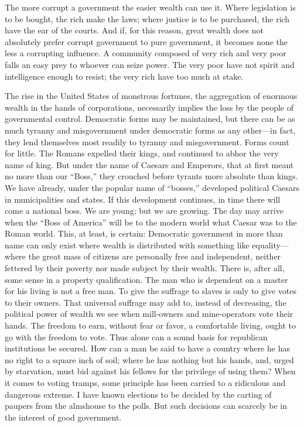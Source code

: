 \documentclass{book}
\begin{document}
The more corrupt a government the easier wealth can use it. Where legislation is to be bought, the rich make the laws; where justice is to be purchased, the rich have the ear of the courts. And if, for this reason, great wealth does not absolutely prefer corrupt government to pure government, it becomes none the less a corrupting influence. A community composed of very rich and very poor falls an easy prey to whoever can seize power. The very poor have not spirit and intelligence enough to resist; the very rich have too much at stake.

The rise in the United States of monstrous fortunes, the aggregation of enormous wealth in the hands of corporations, necessarily implies the loss by the people of governmental control. Democratic forms may be maintained, but there can be as much tyranny and misgovernment under democratic forms as any other—in fact, they lend themselves most readily to tyranny and misgovernment. Forms count for little. The Romans expelled their kings, and continued to abhor the very name of king. But under the name of Caesars and Emperors, that at first meant no more than our “Boss,” they crouched before tyrants more absolute than kings. We have already, under the popular name of “bosses,” developed political Caesars in municipalities and states. If this development continues, in time there will come a national boss. We are young; but we are growing. The day may arrive when the “Boss of America” will be to the modern world what Caesar was to the Roman world. This, at least, is certain: Democratic government in more than name can only exist where wealth is distributed with something like equality—where the great mass of citizens are personally free and independent, neither fettered by their poverty nor made subject by their wealth. There is, after all, some sense in a property qualification. The man who is dependent on a master for his living is not a free man. To give the suffrage to slaves is only to give votes to their owners. That universal suffrage may add to, instead of decreasing, the political power of wealth we see when mill-owners and mine-operators vote their hands. The freedom to earn, without fear or favor, a comfortable living, ought to go with the freedom to vote. Thus alone can a sound basis for republican institutions be secured. How can a man be said to have a country where he has no right to a square inch of soil; where he has nothing but his hands, and, urged by starvation, must bid against his fellows for the privilege of using them? When it comes to voting tramps, some principle has been carried to a ridiculous and dangerous extreme. I have known elections to be decided by the carting of paupers from the almshouse to the polls. But such decisions can scarcely be in the interest of good government.
\end{document}

